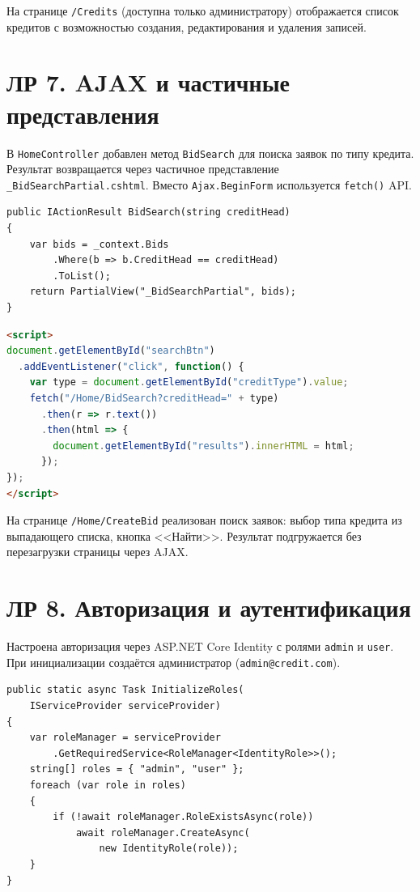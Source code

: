 \documentclass[14pt,a4paper]{extarticle}
\begin{document}
На странице \texttt{/Credits} (доступна только администратору) отображается список кредитов с возможностью создания, редактирования и удаления записей.

\section{ЛР 7. AJAX и частичные представления}

В \texttt{HomeController} добавлен метод \texttt{BidSearch} для поиска заявок по типу кредита. Результат возвращается через частичное представление \texttt{\_BidSearchPartial.cshtml}. Вместо \texttt{Ajax.BeginForm} используется \texttt{fetch()} API.

\begin{lstlisting}[caption={AJAX-поиск заявок},language={[Sharp]C}]
public IActionResult BidSearch(string creditHead)
{
    var bids = _context.Bids
        .Where(b => b.CreditHead == creditHead)
        .ToList();
    return PartialView("_BidSearchPartial", bids);
}
\end{lstlisting}

\begin{lstlisting}[caption={Скрипт fetch() на стороне клиента},language=html]
<script>
document.getElementById("searchBtn")
  .addEventListener("click", function() {
    var type = document.getElementById("creditType").value;
    fetch("/Home/BidSearch?creditHead=" + type)
      .then(r => r.text())
      .then(html => {
        document.getElementById("results").innerHTML = html;
      });
});
</script>
\end{lstlisting}

На странице \texttt{/Home/CreateBid} реализован поиск заявок: выбор типа кредита из выпадающего списка, кнопка <<Найти>>. Результат подгружается без перезагрузки страницы через AJAX.

\section{ЛР 8. Авторизация и аутентификация}

Настроена авторизация через ASP.NET Core Identity с ролями \texttt{admin} и \texttt{user}. При инициализации создаётся администратор (\texttt{admin@credit.com}).

\begin{lstlisting}[caption={Инициализация ролей в SeedData},language={[Sharp]C}]
public static async Task InitializeRoles(
    IServiceProvider serviceProvider)
{
    var roleManager = serviceProvider
        .GetRequiredService<RoleManager<IdentityRole>>();
    string[] roles = { "admin", "user" };
    foreach (var role in roles)
    {
        if (!await roleManager.RoleExistsAsync(role))
            await roleManager.CreateAsync(
                new IdentityRole(role));
    }
}
\end{lstlisting}
\end{document}
